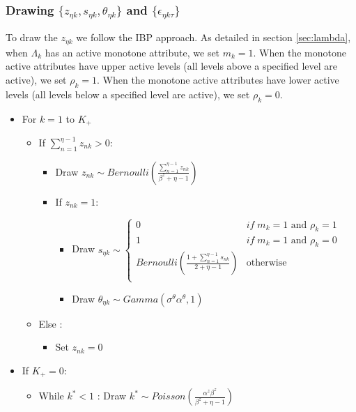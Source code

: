 \documentclass[12pt]{article}
\begin{document}
\subsubsection{Drawing $\{z_{\eta k},s_{\eta k},\theta_{\eta k}\}$ and  $\{\epsilon_{\eta k \tau}\} $}\label{sec:drawparams}
To draw the $z_{\eta k}$ we follow the IBP approach. As detailed in section \ref{sec:lambda}, when $\Lambda_k$ has an active monotone attribute, we set $m_k=1$. When the monotone active attributes have upper active levels (all levels above a specified level are active), we set $\rho_k=1$. When the monotone active attributes have lower active levels (all levels below a specified level are active), we set $\rho_k=0$.
\begin{itemize}
	\item For $k=1$ to $K_+$
	\begin{itemize}
		\item If $\sum_{n=1}^{\eta-1} z_{nk} > 0 $:
		\begin{itemize}
			\item Draw $z_{nk} \sim Bernoulli(\frac{\sum_{n=1}^{\eta-1} z_{nk}}{\beta^z + \eta - 1})$
			\item If $z_{nk} = 1$: 
			\begin{itemize}
				\item Draw $s_{\eta k} \sim \left\{ \begin{array}{cl}
				0 & if \; m_k=1 \text{ and } \rho_k=1\\
				1 & if \; m_k=1 \text{ and } \rho_k=0\\
				Bernoulli(\frac{1 + \sum_{n=1}^{\eta-1} s_{nk}}{2+\eta-1}) & \text{otherwise}\\
				\end{array}\right.$
				\item Draw $\theta_{\eta k} \sim Gamma(\sigma^\theta \alpha^\theta,1)$
			\end{itemize}
		\end{itemize}
		\item Else :
		\begin{itemize}
			\item Set $z_{nk}=0$
		\end{itemize}
	\end{itemize}
	\item If $K_+=0$:
	\begin{itemize}
		\item While $k^* < 1$ : Draw $k^* \sim Poisson(\frac{\alpha^z \beta^z}{\beta^z + \eta - 1})$
	\end{itemize}

\end{itemize}
\end{document}
